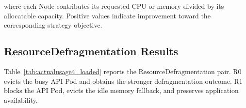where each Node contributes its requested CPU or memory divided by its allocatable capacity. Positive values indicate improvement toward the corresponding strategy objective.

\subsection{ResourceDefragmentation Results}
\label{subsec:actualusage4_resultanalysis_loaded}
Table~\ref{tab:actualusage4_loaded} reports the ResourceDefragmentation pair. R0 evicts the busy API Pod and obtains the stronger defragmentation outcome. R1 blocks the API Pod, evicts the idle memory fallback, and preserves application availability.

\begin{table}[H]
    \centering
    \caption{Descheduler Behavior Under Sustained API Load}
    \label{tab:actualusage4_loaded}
    \renewcommand{\arraystretch}{1.2}
\end{table}

